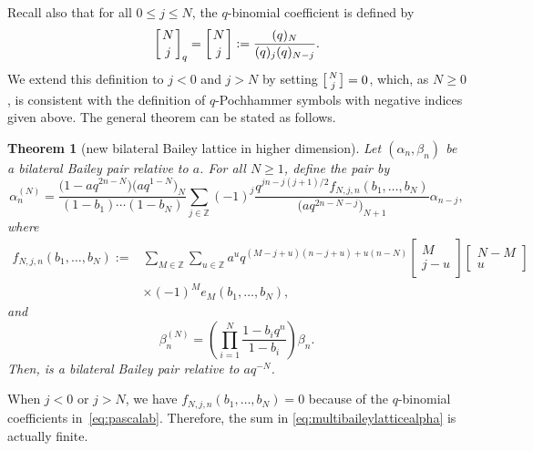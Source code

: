 \documentclass[11pt]{article}
\numberwithin{equation}{section}
\newtheorem{Theorem}{Theorem}[section]
\newcommand{\field}[1]{\mathbb{#1}}
\newcommand{\Z}{\field{Z}}
\begin{document}
Recall also that for all $0\leq j \leq N$, the $q$-binomial coefficient is defined by
\begin{equation*}\left[{N\atop j}\right]_q=\left[{N\atop j}\right]:=\frac{(q)_N}{(q)_j(q)_{N-j}}.
\end{equation*}
We extend this definition to $j<0$ and $j>N$ by setting $\bigl[{N\atop j}\bigr]=0$, which, as $N\geq0$, is consistent with the definition of $q$-Pochhammer symbols with negative indices given above.
The general theorem can be stated as follows.

\begin{Theorem}[new bilateral Bailey lattice in higher dimension]\label{thm:multibaileylattice}
Let $(\alpha_n, \beta_n)$ be a bilateral Bailey pair relative to $a$. For all $N\geq 1$, define the pair  by
\begin{equation}
\alpha^{(N)}_n=\frac{\bigl(1-aq^{2n-N}\bigr)\bigl(aq^{1-N}\bigr)_N}{(1-b_1)\cdots(1-b_N)}\sum_{j \in \Z}(-1)^j\frac{q^{jn-j(j+1)/2}f_{N,j,n}(b_1,\ldots,b_N)}{\bigl(aq^{2n-N-j}\bigr)_{N+1}} \alpha_{n-j},\label{eq:multibaileylatticealpha}
\end{equation}
where
\begin{align}
f_{N,j,n}(b_1,\ldots,b_N) :={}& \sum_{M \in \Z} \sum_{u \in \Z} a^{u}q^{(M-j+u)(n-j+u)+u(n-N)} \begin{bmatrix}
M\\
j-u
\end{bmatrix} \begin{bmatrix}
N-M\\
u
\end{bmatrix}\nonumber\\
&\times (-1)^Me_M(b_1, \dots , b_N),\label{eq:pascalab}
\end{align}
and
\begin{equation}
\beta^{(N)}_n=\left(\prod_{i=1}^N \frac{1-b_iq^n}{1-b_i}\right)\beta_n.\label{eq:multibaileylatticebeta}
\end{equation}
Then,  is a bilateral Bailey pair relative to $aq^{-N}$.
\end{Theorem}

\begin{Remark}
When $j<0$ or $j > N$, we have $f_{N,j,n}(b_1,\ldots,b_N) =0$ because of the $q$-binomial coefficients in~\eqref{eq:pascalab}. Therefore, the sum in \eqref{eq:multibaileylatticealpha} is actually finite.
\end{Remark}
\end{document}
